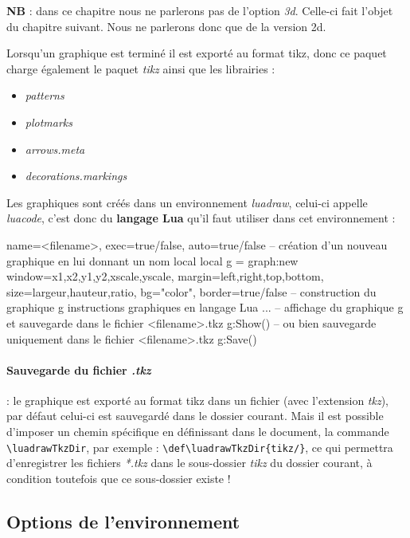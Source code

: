 \noindent\textbf{NB} : dans ce chapitre nous ne parlerons pas de l'option \emph{3d}. Celle-ci fait l'objet du chapitre suivant. Nous ne parlerons donc que de la version 2d.

Lorsqu'un graphique est terminé il est exporté au format tikz, donc ce paquet charge également le paquet \emph{tikz} ainsi que les librairies :
\begin{itemize}
\item\emph{patterns}
\item\emph{plotmarks}
\item\emph{arrows.meta}
\item\emph{decorations.markings}
\end{itemize}

Les graphiques sont créés dans un environnement \emph{luadraw}, celui-ci appelle \emph{luacode}, c'est donc du \textbf{langage Lua} qu'il faut utiliser dans cet environnement :

\begin{TeXcode}
\begin{luadraw}{ name=<filename>, exec=true/false, auto=true/false }
-- création d'un nouveau graphique en lui donnant un nom local
local g = graph:new{ window={x1,x2,y1,y2,xscale,yscale}, margin={left,right,top,bottom},
                     size={largeur,hauteur,ratio}, bg="color", border=true/false }
-- construction du graphique g
    instructions graphiques en langage Lua ...
-- affichage du graphique g et sauvegarde dans le fichier <filename>.tkz
g:Show()
-- ou bien sauvegarde uniquement dans le fichier <filename>.tkz
g:Save()
\end{luadraw}
\end{TeXcode}

\paragraph{Sauvegarde du fichier \emph{.tkz}} : le graphique est exporté au format tikz dans un fichier (avec l'extension \emph{tkz}), par défaut celui-ci est sauvegardé dans le dossier courant. Mais il est possible d'imposer un chemin spécifique en définissant dans le document, la commande \verb|\luadrawTkzDir|, par exemple : \verb|\def\luadrawTkzDir{tikz/}|, ce qui permettra d'enregistrer les fichiers \emph{*.tkz} dans le sous-dossier \emph{tikz} du dossier courant, à condition toutefois que ce sous-dossier existe !

\subsection{Options de l'environnement}

